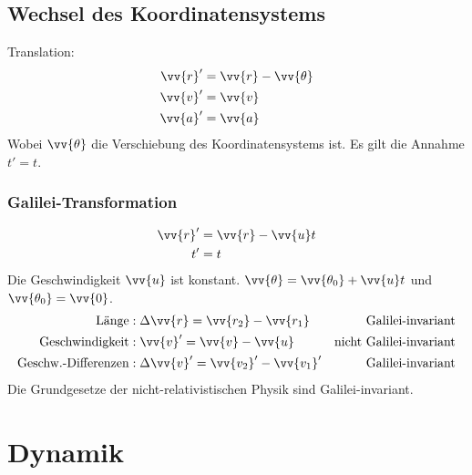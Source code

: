 \documentclass[a4paper,12pt]{article}
\begin{document}
\subsection{Wechsel des Koordinatensystems}
Translation: \begin{align*}
        \vv{r}'&=\vv{r}-\vv{\theta}\\
        \vv{v}'&=\vv{v}\\
        \vv{a}'&=\vv{a}
\end{align*}
Wobei $\vv{\theta}$ die Verschiebung des Koordinatensystems ist. Es gilt die Annahme $t'=t$.

\subsubsection{Galilei-Transformation}
\begin{align*}
        \vv{r}'&=\vv{r}-\vv{u}t\\
        t'&=t
\end{align*}
Die Geschwindigkeit $\vv{u}$ ist konstant. $\vv{\theta }=\vv{\theta _0}+\vv{u}t$ und $\vv{\theta _0}=\vv{0}$.
\begin{align*}
        \text{Länge}&:\Delta \vv{r}=\vv{r_2}-\vv{r_1} &\text{Galilei-invariant}\\
        \text{Geschwindigkeit}&:\vv{v}'=\vv{v}-\vv{u}&\text{nicht Galilei-invariant}\\
        \text{Geschw.-Differenzen}&:\Delta \vv{v}'=\vv{v_2}'-\vv{v_1}'&\text{Galilei-invariant}
\end{align*}
Die Grundgesetze der nicht-relativistischen Physik sind Galilei-invariant.

\section{Dynamik}
\end{document}
